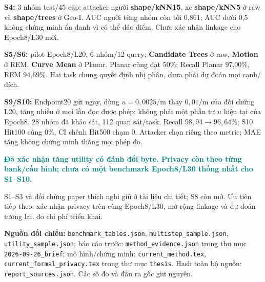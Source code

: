 \documentclass[10pt,a4paper]{article}
\newcommand{\key}[1]{\par\smallskip\noindent\textcolor{teal}{\textbf{#1}}\par\smallskip}
\begin{document}
\textbf{S4:} 3 nhóm test/45 cặp; attacker người \textbf{shape/kNN15}, xe \textbf{shape/kNN5} ở raw và \textbf{shape/trees} ở Geo-I.
AUC người từng nhóm còn tới 0,861; AUC dưới 0,5 không chứng minh ẩn danh vì có thể đảo điểm.
Chưa xác nhận linkage cho Epoch8/L30 mới.

\textbf{S5/S6:} pilot Epoch8/L20, 6 nhóm/12 query; \textbf{Candidate Trees} ở raw, \textbf{Motion} ở REM, \textbf{Curve Mean} ở Planar.
Planar cũng đạt 50\%; Recall Planar 97,00\%, REM 94,69\%. Hai task chung quyết định nhị phân, chưa phải dự đoán mọi cạnh/đích.

\textbf{S9/S10:} Endpoint20 gửi ngay, dùng $u=0{,}0025/\mathrm m$ thay $0{,}01/\mathrm m$ của đối chứng L20,
tăng nhiễu ở mọi lần đọc được phép; không phải một phần tư $u$ hiện tại của Epoch8.
28 nhóm đã khảo sát, 112 quan sát/task. Recall $98{,}94\to96{,}64\%$; S10 Hit100 cùng 0\%, CI chênh Hit500 chạm 0.
Attacker chọn riêng theo metric; MAE tăng không chứng minh thắng mọi phép đo.

\key{Đã xác nhận tăng utility có đánh đổi byte. Privacy còn theo từng bank/cấu hình; chưa có một benchmark Epoch8/L30 thống nhất cho S1--S10.}
S1--S3 và đối chứng paper thích nghi giữ ở tài liệu chi tiết; S8 còn mở.
Ưu tiên tiếp theo: xác nhận privacy trên cùng Epoch8/L30, mở rộng linkage và dự đoán tương lai, đo chi phí triển khai.

{\footnotesize\color{gray}\textbf{Nguồn đối chiếu:} \texttt{benchmark\_tables.json}, \texttt{multistep\_sample.json}, \texttt{utility\_sample.json};
báo cáo trước: \texttt{method\_evidence.json} trong thư mục \texttt{2026-09-26\_brief}; mô hình/chứng minh:
\texttt{current\_method.tex}, \texttt{current\_formal\_privacy.tex} trong thư mục \texttt{thesis}.
Hash toàn bộ nguồn: \texttt{report\_sources.json}. Các số đo và đầu ra gốc giữ nguyên.}
\end{document}
